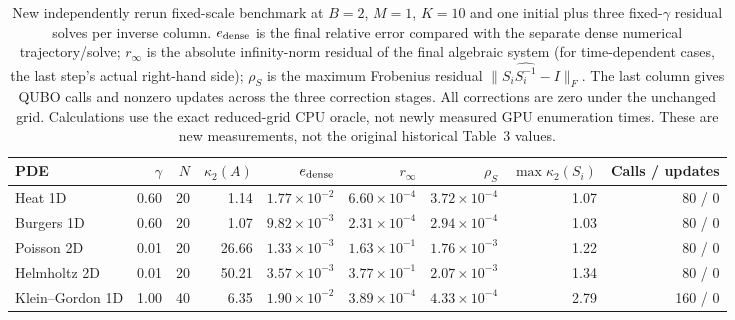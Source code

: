 \begin{table}[t]
\centering
\scriptsize
\caption{New independently rerun fixed-scale benchmark at $B=2$, $M=1$,
$K=10$ and one initial plus three fixed-$\gamma$ residual solves per inverse
column. $e_{\rm dense}$ is the final relative error compared with the
separate dense numerical trajectory/solve; $r_\infty$ is the absolute
infinity-norm residual of the final algebraic system (for time-dependent
cases, the last step's actual right-hand side); $\rho_S$ is the maximum
Frobenius residual $\|S_i\widehat{S_i^{-1}}-I\|_F$. The last column gives
QUBO calls and nonzero updates across the three correction stages. All
corrections are zero under the unchanged grid. Calculations use the exact
reduced-grid CPU oracle, not newly measured GPU enumeration times. These
are new measurements, not the original historical Table~3 values.}
\label{tab:fixed_validation}
\begin{tabular}{lrrrrrrrr}
\toprule
PDE & $\gamma$ & $N$ & $\kappa_2(A)$ & $e_{\rm dense}$ & $r_\infty$ & $\rho_S$ & $\max\kappa_2(S_i)$ & Calls / updates \\
\midrule
Heat 1D & 0.60 & 20 & 1.14 & $1.77\times10^{-2}$ & $6.60\times10^{-4}$ & $3.72\times10^{-4}$ & 1.07 & 80 / 0 \\
Burgers 1D & 0.60 & 20 & 1.07 & $9.82\times10^{-3}$ & $2.31\times10^{-4}$ & $2.94\times10^{-4}$ & 1.03 & 80 / 0 \\
Poisson 2D & 0.01 & 20 & 26.66 & $1.33\times10^{-3}$ & $1.63\times10^{-1}$ & $1.76\times10^{-3}$ & 1.22 & 80 / 0 \\
Helmholtz 2D & 0.01 & 20 & 50.21 & $3.57\times10^{-3}$ & $3.77\times10^{-1}$ & $2.07\times10^{-3}$ & 1.34 & 80 / 0 \\
Klein--Gordon 1D & 1.00 & 40 & 6.35 & $1.90\times10^{-2}$ & $3.89\times10^{-4}$ & $4.33\times10^{-4}$ & 2.79 & 160 / 0 \\
\bottomrule
\end{tabular}
\end{table}

